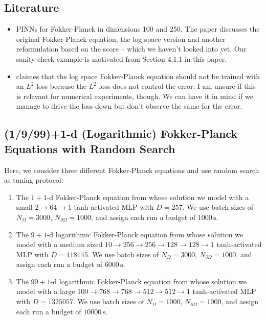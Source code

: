 \subsection{Literature}
\begin{itemize}
\item \cite{hu2024score} PINNs for Fokker-Planck in dimensions 100 and 250. The paper discusses the original Fokker-Planck equation, the log space version and another reformulation based on the score -- which we haven't looked into yet. Our sanity check example is motivated from Section 4.1.1 in this paper.
\item \cite{wang20222} claimes that the log space Fokker-Planck equation should not be trained with an $L^2$ loss because the $L^2$ loss does not control the error. I am unsure if this is relevant for numerical experiments, though. We can have it in mind if we manage to drive the loss down but don't observe the same for the error.
\end{itemize}


\subsection{(1/9/99)+1-d (Logarithmic) Fokker-Planck Equations with Random Search}

Here, we consider three different Fokker-Planck equations and use random search as tuning protocol:
\begin{enumerate}
\item The $1+1$-d Fokker-Planck equation from  whose solution we model with a small $2 \to 64 \to 1$ tanh-activated MLP with $D=\num{257}$. We use batch sizes of $N_{\Omega} = \num{3000}$, $N_{\partial\Omega} = \num{1000}$, and assign each run a budget of $\num{1000}\,\text{s}$.

\item The $9+1$-d logarithmic Fokker-Planck equation from  whose solution we model with a medium sized $10 \to 256 \to 256 \to 128 \to 128 \to 1$ tanh-activated MLP with $D=\num{118145}$.
  We use batch sizes of $N_{\Omega} = \num{3000}$, $N_{\partial\Omega} = \num{1000}$, and assign each run a budget of $\num{6000}\,\text{s}$.

\item The $99+1$-d logarithmic Fokker-Planck equation from  whose solution we model with a large $100 \to 768 \to 768 \to 512 \to 512 \to 1$ tanh-activated MLP with $D=\num{1325057}$. We use batch sizes of $N_{\Omega} = \num{1000}$, $N_{\partial\Omega} = \num{1000}$, and assign each run a budget of $\num{10000}\,\text{s}$.
\end{enumerate}

